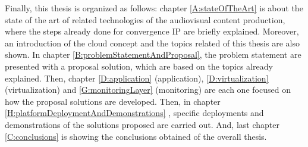 Finally, this thesis is organized as follows: chapter \ref{A:stateOfTheArt} is about the state of the art of related technologies of the audiovisual content production, where the steps already done for convergence IP are briefly explained. Moreover, an introduction of the cloud concept and the topics related of this thesis are also shown. In chapter \ref{B:problemStatementAndProposal}, the problem statement are presented with a proposal solution, which are based on the topics already explained. Then, chapter \ref{D:application} (application), \ref{D:virtualization} (virtualization) and \ref{G:monitoringLayer} (monitoring) are each one focused on how the proposal solutions are developed. Then, in chapter \ref{H:platformDeploymentAndDemonstrations}
, specific deployments and demonstrations of the solutions proposed are carried out. And, last chapter \ref{C:conclusions} is showing the conclusions obtained of the overall thesis.





